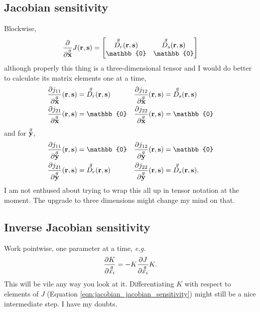 \subsection{Jacobian sensitivity}

Blockwise,
%
\begin{equation}
\pp{}{\g{\ve x}} J(\ve r, \ve s) = 
\begin{bmatrix}
\g{D_r}(\ve r, \ve s) & \g{D_s}(\ve r, \ve s)
\\ \mathbb{0} & \mathbb{0}
\end{bmatrix}
\end{equation}
%
although properly this thing is a three-dimensional tensor and I would do better to calculate its matrix elements one at a time,
%
\begin{equation}
\begin{aligned}
\pp{j_{11}}{\g{\ve x}}(\ve r, \ve s) &= \g{D_r}(\ve r, \ve s) &\pp{j_{12}}{\g{\ve x}}(\ve r, \ve s) &= \g{D_s}(\ve r, \ve s) \\
\pp{j_{21}}{\g{\ve x}}(\ve r, \ve s) &= \mathbb{0} &\pp{j_{22}}{\g{\ve x}}(\ve r, \ve s) &= \mathbb{0}
\end{aligned}
\end{equation}
%
and for $\overset{g}{\textbf{y}}$,
%
\begin{equation}
\begin{aligned}
\pp{j_{11}}{\g{\ve y}}(\ve r, \ve s) &= \mathbb{0} &\pp{j_{12}}{\g{\ve y}}(\ve r, \ve s) &= \mathbb{0} \\
\pp{j_{21}}{\g{\ve y}}(\ve r, \ve s) &= \g{D_r}(\ve r, \ve s) &\pp{j_{22}}{\g{\ve y}}(\ve r, \ve s) &= \g{D_s}(\ve r, \ve s).
\end{aligned}
\end{equation}
%
I am not enthused about trying to wrap this all up in tensor notation at the moment.  The upgrade to three dimensions might change my mind on that.

\subsection{Inverse Jacobian sensitivity}

Work pointwise, one parameter at a time, \emph{e.g.}
%
\begin{equation}
\frac{\partial{K}}{\partial{\overset{g}{x_i}}} = - K \frac{\partial{J}}{\partial{\overset{g}{x_i}}} K.
\end{equation}
%
This will be vile any way you look at it.  Differentiating $K$ with respect to elements of $J$ (Equation \ref{eqn:jacobian_jacobian_sensitivity}) might still be a nice intermediate step.  I have my doubts.







